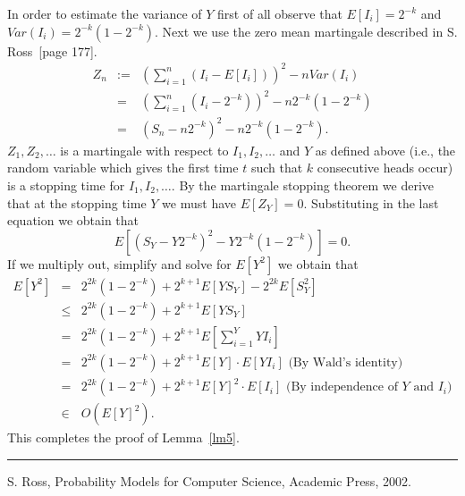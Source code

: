 \documentclass[12pt]{article}
\def\qed{\hfill\rule{2mm}{2mm}}
\begin{document}
In order to estimate the variance of $Y$ first of all observe that
$E[I_i] = 2^{-k}$ and 
$Var (I_i) = 2^{-k} (1 - 2^{-k})$.
Next
we use the zero mean martingale
described in S. Ross~\cite{ross}[page 177].
\begin{eqnarray*}
Z_n 
& := & \left( \sum_{i=1}^n ( I_i - E[I_i] ) \right)^2 - n Var (I_i) \\
& = & \left( \sum_{i=1}^n ( I_i - 2^{-k} ) \right)^2 - n 2^{-k} (1 - 2^{-k}) \\
& = &  \left( S_n - n 2^{-k} \right)^2 - n 2^{-k} (1 - 2^{-k}).
\end{eqnarray*}
$Z_1,Z_2, \ldots$ is a martingale with respect to $I_1, I_2, \ldots $
and $Y$ as defined above
(i.e., the random variable which gives the first time $t$
such that $k$ consecutive heads occur)
is a stopping time for $I_1, I_2, \ldots $.
By the martingale stopping theorem we derive that at the
stopping time $Y$ we must have $E[Z_Y] =0$. Substituting in 
the last equation
we obtain that
$$
E \left[  \left( S_Y - Y 2^{-k} \right)^2 - Y 2^{-k} (1 - 2^{-k}) \right] = 0.
$$
If we multiply out, simplify and solve for $E[Y^2]$ we obtain that
\begin{eqnarray*}
E[Y^2] 
& = & 2^{2k} (1 - 2^{-k}) + 2^{k+1} E[Y S_Y] - 2^{2k} E[S_Y^2] \\
& \leq & 2^{2k} (1 - 2^{-k}) + 2^{k+1} E[Y S_Y] \\
& = & 2^{2k} (1 - 2^{-k}) + 2^{k+1} E\left[\sum_{i=1}^Y Y I_i \right] \\
& = & 2^{2k} (1 - 2^{-k}) + 2^{k+1} E[Y]  \cdot E[ Y I_i ] 
\mbox{ (By Wald's identity)}\\
& = & 2^{2k} (1 - 2^{-k}) + 2^{k+1} E[Y]^2  \cdot E[ I_i ] 
\mbox{ (By independence of $Y$ and $I_i$)}\\
& \in & O(E[Y]^2 ).
\end{eqnarray*}
This completes the proof of Lemma~\ref{lm5}.
\qed





%
%
%

\begin{thebibliography}{99}

S. Ross,
Probability Models for Computer Science,
Academic Press, 2002.

\end{thebibliography}
\end{document}
